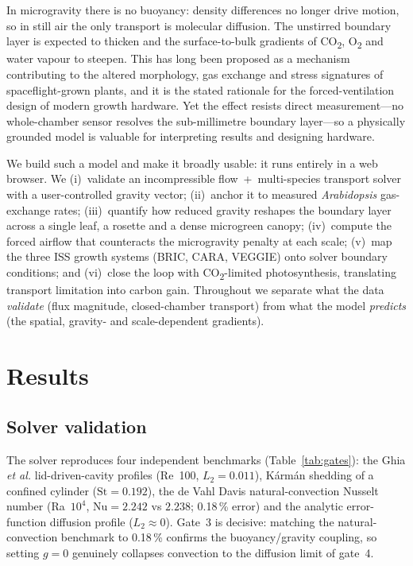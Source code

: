 \documentclass[10pt]{article}
\newcommand{\co}{CO\textsubscript{2}}
\newcommand{\oo}{O\textsubscript{2}}
\begin{document}
In microgravity there is no buoyancy: density differences no longer drive motion, so in still air the only transport is
molecular diffusion. The unstirred boundary layer is expected to thicken and the surface-to-bulk gradients of \co{},
\oo{} and water vapour to steepen. This has long been proposed as a mechanism contributing to the altered morphology,
gas exchange and stress signatures of spaceflight-grown plants\citep{kitaya2003,porterfield2002,barker2023}, and it is
the stated rationale for the forced-ventilation design of modern growth hardware. Yet the effect resists direct
measurement---no whole-chamber sensor resolves the sub-millimetre boundary layer---so a physically grounded model is
valuable for interpreting results and designing hardware.

We build such a model and make it broadly usable: it runs entirely in a web browser. We (i)~validate an incompressible
flow~+~multi-species transport solver with a user-controlled gravity vector; (ii)~anchor it to measured
\textit{Arabidopsis} gas-exchange rates; (iii)~quantify how reduced gravity reshapes the boundary layer across a single
leaf, a rosette and a dense microgreen canopy; (iv)~compute the forced airflow that counteracts the microgravity
penalty at each scale; (v)~map the three ISS growth systems (BRIC, CARA, VEGGIE) onto solver boundary conditions; and
(vi)~close the loop with \co-limited photosynthesis, translating transport limitation into carbon gain. Throughout we
separate what the data \emph{validate} (flux magnitude, closed-chamber transport) from what the model \emph{predicts}
(the spatial, gravity- and scale-dependent gradients).

\section{Results}

\subsection{Solver validation}
The solver reproduces four independent benchmarks (Table~\ref{tab:gates}): the Ghia \textit{et al.}\citep{ghia1982}
lid-driven-cavity profiles (Re~100, $L_2=0.011$), Kármán shedding of a confined cylinder ($\mathrm{St}=0.192$), the
de Vahl Davis\citep{devahldavis1983} natural-convection Nusselt number (Ra~$10^4$, $\mathrm{Nu}=2.242$ vs $2.238$;
0.18\,\% error) and the analytic error-function diffusion profile ($L_2\approx0$). Gate~3 is decisive: matching the
natural-convection benchmark to 0.18\,\% confirms the buoyancy/gravity coupling, so setting $g=0$ genuinely collapses
convection to the diffusion limit of gate~4.
\end{document}
